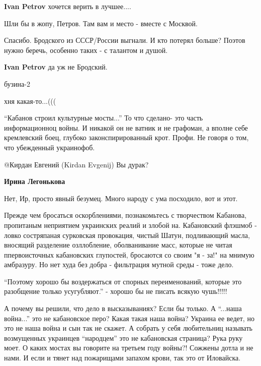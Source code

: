 \begin{itemize}
\begin{itemize} %
\textbf{Ivan Petrov} хочется верить в лучшее....

Шли бы в жопу, Петров. Там вам и место - вместе с Москвой.
\end{itemize} %

Спасибо. Бродского из СССР/России выгнали. И кто потерял больше? Поэтов нужно беречь, особенно таких - с талантом и душой.

\textbf{Ivan Petrov} да уж не Бродский.

бузина-2

хня какая-то...(((


\enquote{Кабанов строил культурные мосты...} То что сделано- это часть информационноц
войны. И никакой он не ватник и не графоман, а вполне себе кремлевский боец,
глубоко законспирированный крот. Профи. Не говоря о том, что убежденный
украинофоб.

\begin{itemize} %
@Кирдан Евгений (Kirdan Evgenij) Вы дурак?

\textbf{Ирина Легонькова} 

Нет, Ир, просто явный безумец. Много народу с ума посходило, вот и этот.


Прежде чем бросаться оскорблениями, познакомьтесь с творчеством Кабанова,
пропитаным неприятием украинских реалий и злобой на. Кабановский флэшмоб -
ловко состряпаная сурковская провокация, чистый Шатун, подливающий масла,
вносящий разделение озллобление, оболванивание масс, которые не читая
ппервоисточных кабановских глупостей, бросаются со своим "я - за!" на мнимую
амбразуру. Но нет худа без добра - фильтрация мутной среды - тоже дело.

\end{itemize} %


\enquote{Поэтому хорошо бы воздержаться от спорных переименований, которые это
разобщение только усугубляют.} - хорошо бы не писать всякую чушь!!!!!



А почему вы решили, что дело в высказываниях? Если бы только. А \enquote{...наша
война...} это не кабановское перо? Какая такая наша война? Украина ее ведет, но
это не наша война и сын так не скажет. А собрать у себя любительниц называть
возмущенных украинцев \enquote{народцем} это не кабановская страница? Рука руку моет. О
каких мостах вы говорите на третьем году войны?! Сожжены дотла и не нами. И
если и тянет над пожарищами запахом крови, так это от Иловайска.



\end{itemize}
